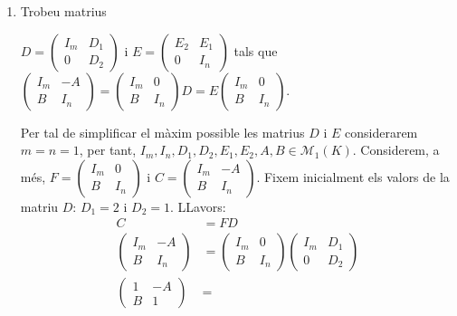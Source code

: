 \documentclass[11pt,a4paper]{article}
\begin{document}
\begin{enumerate}
   
   
    \item Trobeu matrius\par 
    $D=\begin{pmatrix}
   I_m & D_1 \\
   0 & D_2
   \end{pmatrix}$ i
   $E=\begin{pmatrix}
   E_2 & E_1 \\
   0 & I_n
   \end{pmatrix}$ tals que
   $\begin{pmatrix}
   I_m & -A \\
   B & I_n
   \end{pmatrix}=
   \begin{pmatrix}
   I_m & 0 \\
   B & I_n
   \end{pmatrix}D=
   E\begin{pmatrix}
   I_m & 0 \\
   B & I_n
   \end{pmatrix}.$\par
   Per tal de simplificar el màxim possible les matrius $D$ i $E$ considerarem $m=n=1$, per tant, $I_m,I_n,D_1,D_2,E_1,E_2,A,B \in \mathcal{M}_1(K)$. Considerem, a més, $F=\begin{pmatrix}
   I_m & 0 \\
   B & I_n
   \end{pmatrix}$ i $C=\begin{pmatrix}
   I_m & -A \\
   B & I_n
   \end{pmatrix}$. Fixem inicialment els valors de la matriu $D$: $D_1=2$ i $D_2=1$. LLavors:
   \begin{align*}
       C&=FD \\
   \begin{pmatrix}
   I_m & -A \\
   B & I_n
   \end{pmatrix}&=
   \begin{pmatrix}
   I_m & 0 \\
   B & I_n
   \end{pmatrix}
   \begin{pmatrix}
   I_m & D_1 \\
   0 & D_2
   \end{pmatrix} \\
   \begin{pmatrix}
   1 & -A \\
   B & 1
   \end{pmatrix}&=

\end{align*}
\end{enumerate}
\end{document}

